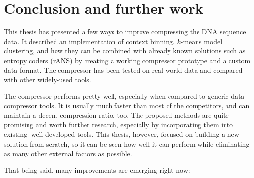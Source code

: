 \section{Conclusion and further work}\label{sec:conclusion-and-further-work}

This thesis has presented a few ways to improve compressing the DNA sequence
data.
It described an implementation of context binning, $k$-means model clustering,
and how they can be combined with already known solutions such as entropy
coders (rANS) by creating a working compressor prototype and a custom data
format.
The compressor has been tested on real-world data and compared with other
widely-used tools.

The compressor performs pretty well, especially when compared to generic data
compressor tools.
It is usually much faster than most of the competitors, and can maintain a
decent compression ratio, too.
The proposed methods are quite promising and worth further research,
especially by incorporating them into existing, well-developed tools.
This thesis, however, focused on building a new solution from scratch, so it
can be seen how well it can perform while eliminating as many other external
factors as possible.

That being said, many improvements are emerging right now:


